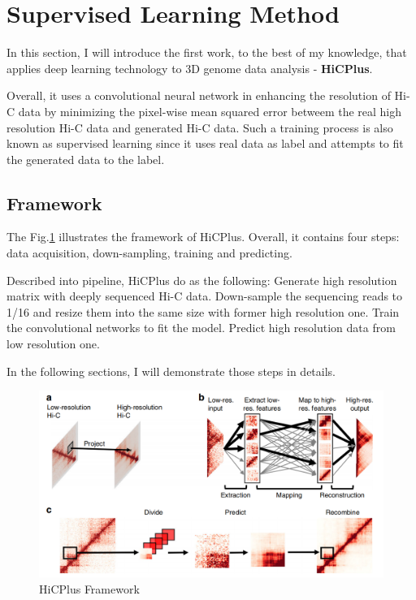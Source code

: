 \documentclass{article}
\begin{document}
\section{Supervised Learning Method}
In this section, I will introduce the first work, to the best of my knowledge, that applies deep learning technology to 3D genome data analysis - \textbf{HiCPlus}\cite{hicplus}.

Overall, it uses a convolutional neural network in enhancing the resolution of Hi-C data by minimizing the pixel-wise mean squared error betweem the real high resolution Hi-C data and generated Hi-C data. Such a training process is also known as supervised learning since it uses real data as label and attempts to fit the generated data to the label.

\subsection{Framework}

The Fig.\ref{hicplusframe} illustrates the framework of HiCPlus. Overall, it contains four steps:
data acquisition, down-sampling, training and predicting.

Described into pipeline, HiCPlus do as the following: Generate high resolution matrix with deeply sequenced Hi-C data. Down-sample the sequencing reads to 1/16 and resize them into the same size with former high resolution one. Train the convolutional networks to fit the model. Predict high resolution data from low resolution one.

In the following sections, I will demonstrate those steps in details.

\begin{figure}[H]
    \centering
    \includegraphics[scale=0.3]{./docs/hicplus_framework.jpg}
    \caption{HiCPlus Framework}\label{hicplusframe}
\end{figure}
\end{document}
